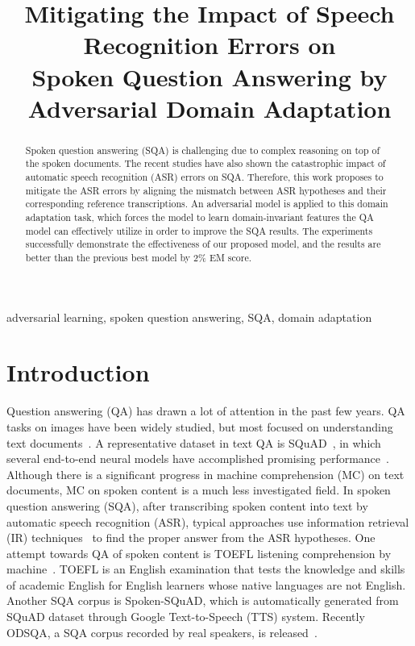 \documentclass{article}
\title{Mitigating the Impact of Speech Recognition Errors on \\Spoken Question Answering by Adversarial Domain Adaptation}
\begin{document}
\maketitle
\begin{abstract}
Spoken question answering (SQA) is challenging due to complex reasoning on top of the spoken documents.
The recent studies have also shown the catastrophic impact of automatic speech recognition (ASR) errors on SQA. 
Therefore, this work proposes to mitigate the ASR errors by aligning the mismatch between ASR hypotheses and their corresponding reference transcriptions. 
An adversarial model is applied to this domain adaptation task, which forces the model to learn domain-invariant features the QA model can effectively utilize in order to improve the SQA results.
The experiments successfully demonstrate the effectiveness of our proposed model, and the results are better than the previous best model by 2\% EM score.
\end{abstract}
\begin{keywords}
adversarial learning, spoken question answering, SQA, domain adaptation
\end{keywords}
\section{Introduction}
\label{sec:intro}

Question answering (QA) has drawn a lot of attention in the past few years. 
QA tasks on images \cite{zitnick2016adopting} have been widely studied, but most focused on understanding text documents~\cite{rajpurkar2016squad}. 
A representative dataset in text QA is SQuAD~\cite{rajpurkar2016squad}, in which several end-to-end neural models have accomplished promising performance~\cite{yu2018qanet}. 
Although there is a significant progress in machine comprehension (MC) on text documents, MC on spoken content is a much less investigated field. 
In spoken question answering (SQA), after transcribing spoken content into text by automatic speech recognition (ASR), typical approaches use information retrieval (IR) techniques~\cite{shiang2014spoken} to find the proper answer from the ASR hypotheses. 
One attempt towards QA of spoken content is TOEFL listening comprehension by machine~\cite{tseng2016towards}. 
TOEFL is an English examination that tests the knowledge and skills of academic English for English learners whose native languages are not English. 
Another SQA corpus is Spoken-SQuAD\cite{li2018spoken}, which is automatically generated from SQuAD dataset through Google Text-to-Speech (TTS) system. 
Recently ODSQA, a SQA corpus recorded by real speakers, is released~\cite{lee2018odsqa}. 
\end{document}
